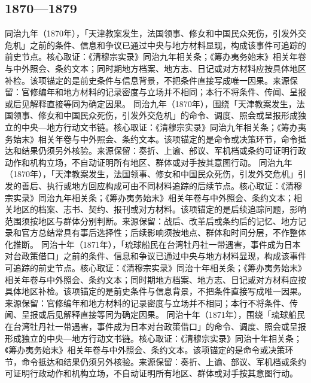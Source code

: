 \subsection{1870—1879}
同治九年（1870年），「天津教案发生，法国领事、修女和中国民众死伤，引发外交危机」之前的条件、信息和争议已通过中央与地方材料显现，构成该事件可追踪的前史节点。核心取证：《清穆宗实录》同治九年相关条；《筹办夷务始末》相关年卷与中外照会、条约文本；同时期地方档案、地方志、日记或对方材料应按具体地区补检。该项锚定的是前史条件与信息背景，不把条件直接写成唯一因果。来源保留：官修编年和地方材料的记录密度与立场并不相同；本行不将条件、传闻、呈报或后见解释直接等同为确定因果。
同治九年（1870年），围绕「天津教案发生，法国领事、修女和中国民众死伤，引发外交危机」的命令、调度、照会或呈报形成独立的中央—地方行动文书链。核心取证：《清穆宗实录》同治九年相关条；《筹办夷务始末》相关年卷与中外照会、条约文本。该项锚定的是命令或决策环节，命令抵达和结果仍须另外核验。来源保留：奏折、上谕、部议、军机档或条约可证明行政动作和机构立场，不自动证明所有地区、群体或对手按其意图行动。
同治九年（1870年），「天津教案发生，法国领事、修女和中国民众死伤，引发外交危机」引发的善后、执行或地方回应构成可由不同材料追踪的后续节点。核心取证：《清穆宗实录》同治九年相关条；《筹办夷务始末》相关年卷与中外照会、条约文本；相关地区的档案、志书、契约、报刊或对方材料。该项锚定的是后续追踪问题，影响范围须按地区与群体分别判断。来源保留：战后、改革后或条约后的记忆、地方记录和官方总结常具有事后选择性；后续影响须按地点、群体和时间分层，不作整体化推断。
同治十年（1871年），「琉球船民在台湾牡丹社一带遇害，事件成为日本对台政策借口」之前的条件、信息和争议已通过中央与地方材料显现，构成该事件可追踪的前史节点。核心取证：《清穆宗实录》同治十年相关条；《筹办夷务始末》相关年卷与中外照会、条约文本；同时期地方档案、地方志、日记或对方材料应按具体地区补检。该项锚定的是前史条件与信息背景，不把条件直接写成唯一因果。来源保留：官修编年和地方材料的记录密度与立场并不相同；本行不将条件、传闻、呈报或后见解释直接等同为确定因果。
同治十年（1871年），围绕「琉球船民在台湾牡丹社一带遇害，事件成为日本对台政策借口」的命令、调度、照会或呈报形成独立的中央—地方行动文书链。核心取证：《清穆宗实录》同治十年相关条；《筹办夷务始末》相关年卷与中外照会、条约文本。该项锚定的是命令或决策环节，命令抵达和结果仍须另外核验。来源保留：奏折、上谕、部议、军机档或条约可证明行政动作和机构立场，不自动证明所有地区、群体或对手按其意图行动。
